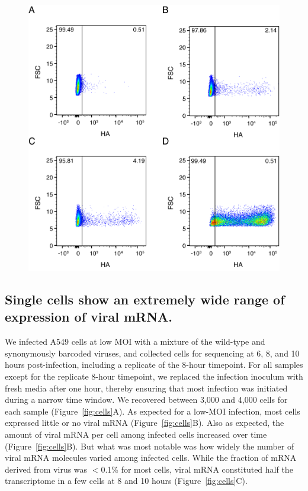 \documentclass[9pt,lineno]{elife}
\begin{document}
\begin{figure}
{}{\includegraphics[width=0.7\linewidth]{figures/Validating_barcode_virus/HA_stain_supplement.png}}\end{figure}

\subsection{Single cells show an extremely wide range of expression of viral mRNA.}
We infected A549 cells at low MOI with a mixture of the wild-type and synonymously barcoded viruses, and collected cells for sequencing at 6, 8, and 10 hours post-infection, including a replicate of the 8-hour timepoint.
For all samples except for the replicate 8-hour timepoint, we replaced the infection inoculum with fresh media after one hour, thereby ensuring that most infection was initiated during a narrow time window.
We recovered between 3,000 and 4,000 cells for each sample (Figure~\ref{fig:cells}A). 
As expected for a low-MOI infection, most cells expressed little or no viral mRNA (Figure~\ref{fig:cells}B).
Also as expected, the amount of viral mRNA per cell among infected cells increased over time (Figure~\ref{fig:cells}B).
But what was most notable was how widely the number of viral mRNA molecules varied among infected cells.
While the fraction of mRNA derived from virus was $<$0.1\% for most cells, viral mRNA constituted half the transcriptome in a few cells at 8 and 10 hours (Figure~\ref{fig:cells}C).
\end{document}
